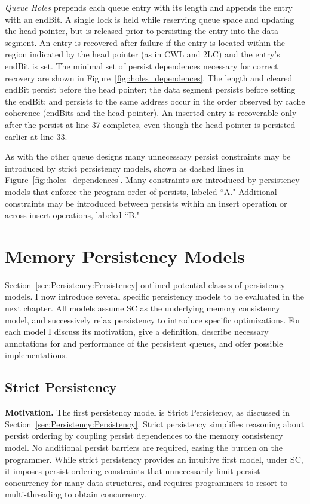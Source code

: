 

\emph{Queue Holes} prepends each queue entry with its length and appends the entry with an endBit.
A single lock is held while reserving queue space and updating the head pointer, but is released prior to persisting the entry into the data segment.
An entry is recovered after failure if the entry is located within the region indicated by the head pointer (as in CWL and 2LC) and the entry's endBit is set.
The minimal set of persist dependences necessary for correct recovery are shown in Figure~\ref{fig::holes_dependences}.
The length and cleared endBit persist before the head pointer; the data segment persists before setting the endBit; and persists to the same address occur in the order observed by cache coherence (endBits and the head pointer).
An inserted entry is recoverable only after the persist at line 37 completes, even though the head pointer is persisted earlier at line 33.

As with the other queue designs many unnecessary persist constraints may be introduced by strict persistency models, shown as dashed lines in Figure~\ref{fig::holes_dependences}.
Many constraints are introduced by persistency models that enforce the program order of persists, labeled ``A."
Additional constraints may be introduced between persists within an insert operation or across insert operations, labeled ``B."

\section{Memory Persistency Models}
\label{sec:PersistencyModels:Models}

Section~\ref{sec:Persistency:Persistency} outlined potential classes of persistency models.
I now introduce several specific persistency models to be evaluated in the next chapter.
All models assume SC as the underlying memory consistency model, and successively relax persistency to introduce specific optimizations.
For each model I discuss its motivation, give a definition, describe necessary annotations for and performance of the persistent queues, and offer possible implementations.

\subsection{Strict Persistency}
\label{section:PersistencyModels:Strict}

\textbf{Motivation.}
The first persistency model is Strict Persistency, as discussed in Section~\ref{sec:Persistency:Persistency}.
Strict persistency simplifies reasoning about persist ordering by coupling persist dependences to the memory consistency model.
No additional persist barriers are required, easing the burden on the programmer.
While strict persistency provides an intuitive first model, under SC, it imposes persist ordering constraints that unnecessarily limit persist concurrency for many data structures, and requires programmers to resort to multi-threading to obtain concurrency.

